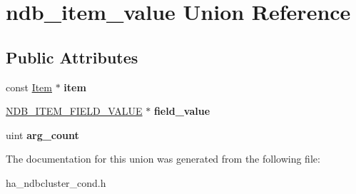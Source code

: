 \hypertarget{unionndb__item__value}{}\section{ndb\+\_\+item\+\_\+value Union Reference}
\label{unionndb__item__value}
\subsection*{Public Attributes}
\begin{DoxyCompactItemize}
\item 
\mbox{\label{unionndb__item__value_a0d511a378d82d1350d38e63f668c32cd}} 
const \mbox{\hyperlink{classItem}{Item}} $\ast$ {\bfseries item}
\item 
\mbox{\label{unionndb__item__value_a13349e403ba6bb818e3b3f38caf79258}} 
\mbox{\hyperlink{structndb__item__field__value}{N\+D\+B\+\_\+\+I\+T\+E\+M\+\_\+\+F\+I\+E\+L\+D\+\_\+\+V\+A\+L\+UE}} $\ast$ {\bfseries field\+\_\+value}
\item 
\mbox{\label{unionndb__item__value_a3bbe81820823fc762e8e53c6a8392da9}} 
uint {\bfseries arg\+\_\+count}
\end{DoxyCompactItemize}


The documentation for this union was generated from the following file\+:\begin{DoxyCompactItemize}
\item 
ha\+\_\+ndbcluster\+\_\+cond.\+h\end{DoxyCompactItemize}
